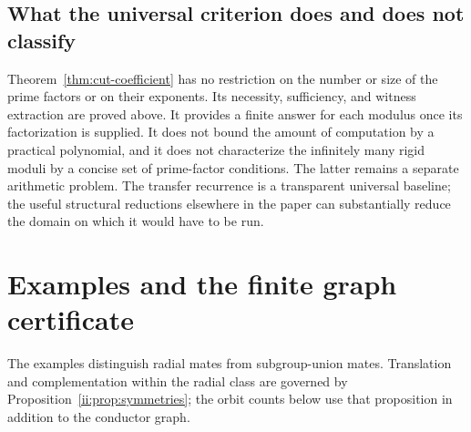 \documentclass[11pt]{article}
\numberwithin{equation}{section}
\theoremstyle{definition}
\theoremstyle{remark}
\begin{document}
\subsection{What the universal criterion does and does not classify}

Theorem~\ref{thm:cut-coefficient} has no restriction on the number or size
of the prime factors or on their exponents.  Its necessity, sufficiency,
and witness extraction are proved above.  It provides a finite answer
for each modulus once its factorization is supplied.  It does not bound
the amount of computation by a practical polynomial, and it does not
characterize the infinitely many rigid moduli by a concise set of
prime-factor conditions.  The latter remains a separate arithmetic
problem.  The transfer recurrence is a transparent universal baseline;
the useful structural reductions elsewhere in the paper can substantially
reduce the domain on which it would have to be run.




\section{Examples and the finite graph certificate}

The examples distinguish radial mates from subgroup-union mates.
Translation and complementation within the radial class are governed
by Proposition~\ref{ii:prop:symmetries}; the orbit counts below use that
proposition in addition to the conductor graph.
\end{document}
